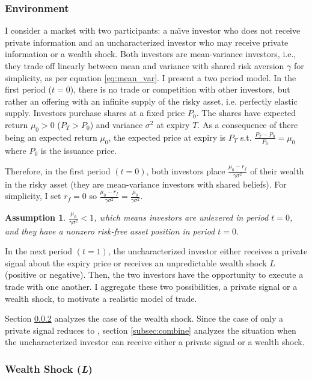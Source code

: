 \documentclass[12pt]{article}
\newtheorem{assumption}{Assumption}
\begin{document}
\subsubsection{Environment}
\par I consider a market with two participants: a na\"{\i}ve investor who does not receive private information and an uncharacterized investor who may receive private information or a wealth shock. Both investors are mean-variance investors, i.e., they trade off linearly between mean and variance with shared risk aversion $\gamma$ for simplicity, as per equation \eqref{eq:mean_var}. I present a two period model. In the first period ($t=0$), there is no trade or competition with other investors, but rather an offering with an infinite supply of the risky asset, i.e. perfectly elastic supply. Investors purchase shares at a fixed price $P_0$. The shares have expected return $\mu_0 > 0$ ($P_T > P_0$) and variance $\sigma^2$ at expiry $T$. As a consequence
of there being an expected return $\mu_0$, the expected price at expiry is $P_T$ s.t. $\frac{P_T - P_0}{P_0} = \mu_0$ where $P_0$ is the issuance price.

Therefore, in the first period $(t=0)$, both investors place $\frac{\mu_0-r_f}{\gamma\sigma^2}$ of their wealth in the risky asset (they are mean-variance investors with shared beliefs). For simplicity, I set $r_f = 0$ so \mbox{$\frac{\mu_0-r_f}{\gamma\sigma^2} = \frac{\mu_0}{\gamma\sigma^2}$}. 

\begin{assumption}
\label{assumption:nonzero-cash}
 \( \frac{\mu_0}{\gamma\sigma^2} < 1 \), which means investors are unlevered in period \(t=0\), and they have a nonzero risk-free asset position in period \(t=0\).
\end{assumption}
In the next period $(t=1)$, the uncharacterized investor either receives a private signal about the expiry price or receives an unpredictable wealth shock $L$ (positive or negative). Then, the two investors have the opportunity to execute a trade with one another. I aggregate these two possibilities, a private signal or a wealth shock, to motivate a realistic model of trade.

Section \ref{subsec:wealth_shock} analyzes the case of the wealth shock. Since the case of only a private signal reduces to \citet{MILGROM198217}, section \ref{subsec:combine} analyzes the situation when the uncharacterized investor can receive either a private signal or a wealth shock.

\subsubsection{Wealth Shock (\textit{L})} \label{subsec:wealth_shock}
\end{document}
